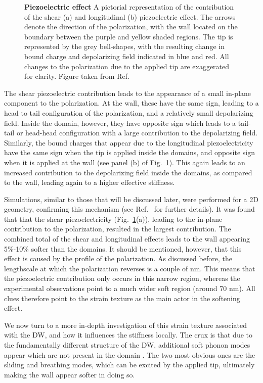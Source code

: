 \begin{figure}[h]
	\caption{\label{fig:BTO_depolarizing}{\bf Piezoelectric effect} A pictorial representation of the contribution of the shear (a) and longitudinal (b) piezoelectric effect. The arrows denote the direction of the polarization, with the wall located on the boundary between the purple and yellow shaded regions. The tip is represented by the grey bell-shapes, with the resulting change in bound charge and depolarizing field indicated in blue and red. All changes to the polarization due to the applied tip are exaggerated for clarity. Figure taken from Ref.~\cite{Stefani2020}}
\end{figure}

The shear piezoelectric contribution leads to the appearance of a small in-plane component to the polarization.
At the wall, these have the same sign, leading to a head to tail configuration of the polarization, and a relatively small depolarizing field.
Inside the domain, however, they have opposite sign which leads to a tail-tail or head-head configuration with a large contribution to the depolarizing field.
Similarly, the bound charges that appear due to the longitudinal piezoelectricity have the same sign when the tip is applied inside the domains, and opposite sign when it is applied at the wall (see panel (b) of Fig.~\ref{fig:BTO_depolarizing}).
This again leads to an increased contribution to the depolarizing field inside the domains, as compared to the wall, leading again to a higher effective stiffness.

Simulations, similar to those that will be discussed later, were performed for a 2D geometry, confirming this mechanism (see Ref.~\cite{Stefani2020} for further details).
It was found that that the shear piezoelectricity (Fig.~\ref{fig:BTO_depolarizing}(a)), leading to the in-plane contribution to the polarization, resulted in the largest contribution.
The combined total of the shear and longitudinal effects leads to the wall appearing 5\%-10\% softer than the domains.
It should be mentioned, however, that this effect is caused by the profile of the polarization.
As discussed before, the lengthscale at which the polarization reverses is a couple of nm.
This means that the piezoelectric contribution only occurs in this narrow region, whereas the experimental observations point to a much wider soft region (around 70 nm).
All clues therefore point to the strain texture as the main actor in the softening effect.

We now turn to a more in-depth investigation of this strain texture associated with the DW, and how it influences the stiffness locally.
The crux is that due to the fundamentally different structure of the DW, additional soft phonon modes appear which are not present in the domain \cite{Chen2020}.
The two most obvious ones are the sliding and breathing modes, which can be excited by the applied tip, ultimately making the wall appear softer in doing so.

